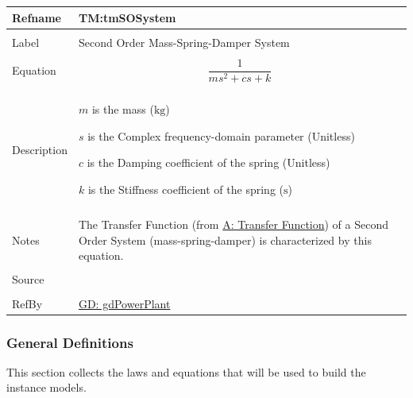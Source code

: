 \documentclass[12pt]{article}
\begin{document}
\begin{minipage}{\textwidth}
\begin{tabular}{>{\raggedright}p{}>{\raggedright\arraybackslash}p{}}
\toprule \textbf{Refname} & \textbf{TM:tmSOSystem}
\label{TM:tmSOSystem}
\\ \midrule \\
Label & Second Order Mass-Spring-Damper System
        
\\ \midrule \\
Equation & \begin{displaymath}
           \frac{1}{m s^{2}+c s+k}
           \end{displaymath}
\\ \midrule \\
Description & \begin{symbDescription}
              \item{$m$ is the mass (${\text{kg}}$)}
              \item{$s$ is the Complex frequency-domain parameter (Unitless)}
              \item{$c$ is the Damping coefficient of the spring (Unitless)}
              \item{$k$ is the Stiffness coefficient of the spring (${\text{s}}$)}
              \end{symbDescription}
\\ \midrule \\
Notes & The Transfer Function (from \hyperref[pwrPlantTxFnx]{A: Transfer Function}) of a Second Order System (mass-spring-damper) is characterized by this equation.
        
\\ \midrule \\
Source & \cite{abbasi2015}
         
\\ \midrule \\
RefBy & \hyperref[GD:gdPowerPlant]{GD: gdPowerPlant}
        
\\ \bottomrule
\end{tabular}
\end{minipage}
\subsubsection{General Definitions}
\label{Sec:GDs}
This section collects the laws and equations that will be used to build the instance models.
\end{document}
